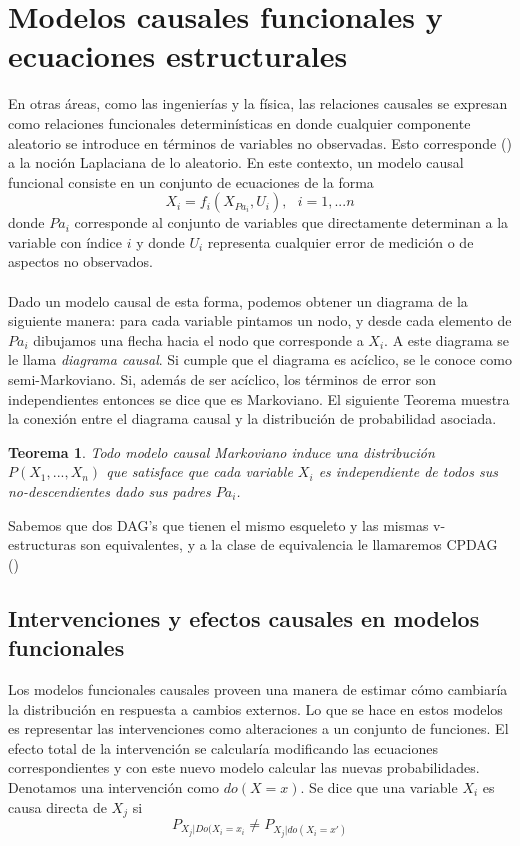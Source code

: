 \documentclass[11pt]{article}
\theoremstyle{plain}
\newtheorem{teo}{Teorema}
\begin{document}
\section{Modelos causales funcionales y ecuaciones estructurales}
En otras áreas, como las ingenierías y la física, las relaciones causales se expresan como relaciones funcionales determinísticas en donde cualquier componente aleatorio se introduce en términos de variables no observadas. Esto corresponde (\cite{pearl2009causality}) a la noción Laplaciana de lo aleatorio. En este contexto, un modelo causal funcional consiste en un conjunto de ecuaciones de la forma
\[ X_i = f_i (X_{Pa_i},U_i), \textrm{  } i=1,...n\]
donde $Pa_i$ corresponde al conjunto de variables que directamente determinan a la variable con índice $i$ y donde $U_i$ representa cualquier error de medición o de aspectos no observados.\\
\\
Dado un modelo causal de esta forma, podemos obtener un diagrama de la siguiente manera: para cada variable pintamos un nodo, y desde cada elemento de $Pa_i$ dibujamos una flecha hacia el nodo que corresponde a $X_i$. A este diagrama se le llama \textit{diagrama causal}. Si cumple que el diagrama es acíclico, se le conoce como semi-Markoviano. Si, además de ser acíclico, los términos de error son independientes entonces se dice que es Markoviano. El siguiente Teorema muestra la conexión entre el diagrama causal y la distribución de probabilidad asociada. 
\begin{teo}
Todo modelo causal Markoviano induce una distribución $P(X_1,...,X_n)$ que satisface que cada variable $X_i$ es independiente de todos sus no-descendientes dado sus padres $Pa_i$.
\end{teo}
Sabemos que dos DAG's que tienen el mismo esqueleto y las mismas v-estructuras son equivalentes, y a la clase de equivalencia le llamaremos CPDAG (\cite{goudet2017learning})
\subsection{Intervenciones y efectos causales en modelos funcionales}
Los modelos funcionales causales proveen una manera de estimar cómo cambiaría la distribución en respuesta a cambios externos. Lo que se hace en estos modelos es representar las intervenciones como alteraciones a un conjunto de funciones. El efecto total de la intervención se calcularía modificando las ecuaciones correspondientes y con este nuevo modelo calcular las nuevas probabilidades. Denotamos una intervención como $do(X=x)$. Se dice que una variable $X_i$ es causa directa de $X_j$ si
\[ P_{X_j | Do(X_i = x_i} \neq P_{X_j | do(X_i = x')} \]
\end{document}
